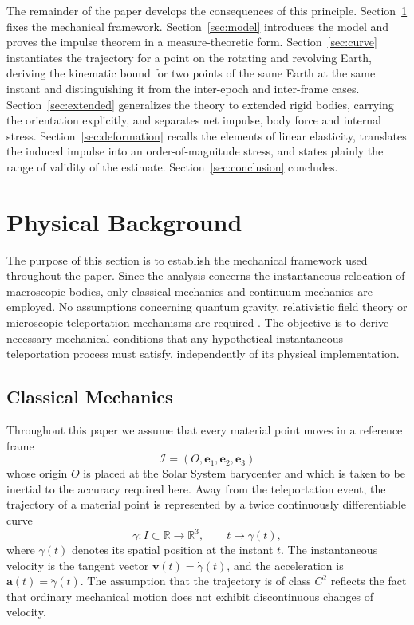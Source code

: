 \documentclass[11pt]{article}
\begin{document}
	The remainder of the paper develops the consequences of this
	principle. Section~\ref{sec:background} fixes the mechanical
	framework. Section~\ref{sec:model} introduces the model and proves
	the impulse theorem in a measure-theoretic form. Section~\ref{sec:curve}
	instantiates the trajectory for a point on the rotating and revolving
	Earth, deriving the kinematic bound for two points of the same Earth
	at the same instant and distinguishing it from the inter-epoch and
	inter-frame cases. Section~\ref{sec:extended} generalizes the theory
	to extended rigid bodies, carrying the orientation explicitly, and
	separates net impulse, body force and internal stress.
	Section~\ref{sec:deformation} recalls the elements of linear
	elasticity, translates the induced impulse into an order-of-magnitude
	stress, and states plainly the range of validity of the estimate.
	Section~\ref{sec:conclusion} concludes.
	
	\section{Physical Background}
	\label{sec:background}
	
	The purpose of this section is to establish the mechanical framework
	used throughout the paper. Since the analysis concerns the
	instantaneous relocation of macroscopic bodies, only classical
	mechanics and continuum mechanics are employed. No assumptions
	concerning quantum gravity, relativistic field theory or microscopic
	teleportation mechanisms are required \cite{Goldstein2002,LandauLifshitz1976}.
	The objective is to derive necessary mechanical conditions that any
	hypothetical instantaneous teleportation process must satisfy,
	independently of its physical implementation.
	
	\subsection{Classical Mechanics}
	
	Throughout this paper we assume that every material point moves in a
	reference frame
	\[
	\mathcal I=(O,\mathbf e_1,\mathbf e_2,\mathbf e_3)
	\]
	whose origin $O$ is placed at the Solar System barycenter and which is
	taken to be inertial to the accuracy required here. Away from the
	teleportation event, the trajectory of a material point is represented
	by a twice continuously differentiable curve
	\[
	\gamma:I\subset\mathbb R\longrightarrow\mathbb R^3,
	\qquad t\mapsto\gamma(t),
	\]
	where $\gamma(t)$ denotes its spatial position at the instant $t$. The
	instantaneous velocity is the tangent vector
	$\mathbf v(t)=\dot{\gamma}(t)$, and the acceleration is
	$\mathbf a(t)=\ddot{\gamma}(t)$. The assumption that the trajectory is
	of class $C^2$ reflects the fact that ordinary mechanical motion does
	not exhibit discontinuous changes of velocity.
	
\end{document}

